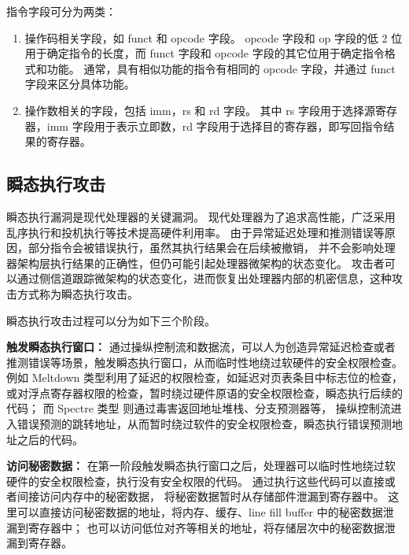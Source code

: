 指令字段可分为两类：
\begin{enumerate}
    \item 操作码相关字段，如 funct 和 opcode 字段。
opcode 字段和 op 字段的低 2 位用于确定指令的长度，而 funct 字段和 opcode 字段的其它位用于确定指令格式和功能。
通常，具有相似功能的指令有相同的 opcode 字段，并通过 funct 字段来区分具体功能。\par
    \item 操作数相关的字段，包括 imm，rs 和 rd 字段。
其中 rs 字段用于选择源寄存器，imm 字段用于表示立即数，rd 字段用于选择目的寄存器，即写回指令结果的寄存器。\par
\end{enumerate}

\subsection{瞬态执行攻击}
瞬态执行漏洞是现代处理器的关键漏洞。
现代处理器为了追求高性能，广泛采用乱序执行和投机执行等技术提高硬件利用率。
由于异常延迟处理和推测错误等原因，部分指令会被错误执行，虽然其执行结果会在后续被撤销，
并不会影响处理器架构层执行结果的正确性，但仍可能引起处理器微架构的状态变化。
攻击者可以通过侧信道跟踪微架构的状态变化，进而恢复出处理器内部的机密信息，这种攻击方式称为瞬态执行攻击。\par

瞬态执行攻击过程可以分为如下三个阶段。\par

\textbf{触发瞬态执行窗口：}
通过操纵控制流和数据流，可以人为创造异常延迟检查或者推测错误等场景，触发瞬态执行窗口，从而临时性地绕过软硬件的安全权限检查。
例如 Meltdown 类型利用了延迟的权限检查，如延迟对页表条目中标志位的检查\cite{horn2018meltdown}，
或对浮点寄存器权限的检查\cite{stecklina1806lazyfp}，暂时绕过硬件原语的安全权限检查，瞬态执行后续的代码；
而 Spectre 类型\cite{kocher2020spectre} 则通过毒害返回地址堆栈\cite{maisuradze2018ret2spec}、分支预测器等，
操纵控制流进入错误预测的跳转地址，从而暂时绕过软件的安全权限检查，瞬态执行错误预测地址之后的代码。\par

\textbf{访问秘密数据：}
在第一阶段触发瞬态执行窗口之后，处理器可以临时性地绕过软硬件的安全权限检查，执行没有安全权限的代码。
通过执行这些代码可以直接或者间接访问内存中的秘密数据，
将秘密数据暂时从存储部件泄漏到寄存器中\cite{van2019ridl}\cite{van2021cacheout}。
这里可以直接访问秘密数据的地址，将内存、缓存、line fill buffer 中的秘密数据泄漏到寄存器中；
也可以访问低位对齐等相关的地址，将存储层次中的秘密数据泄漏到寄存器。

